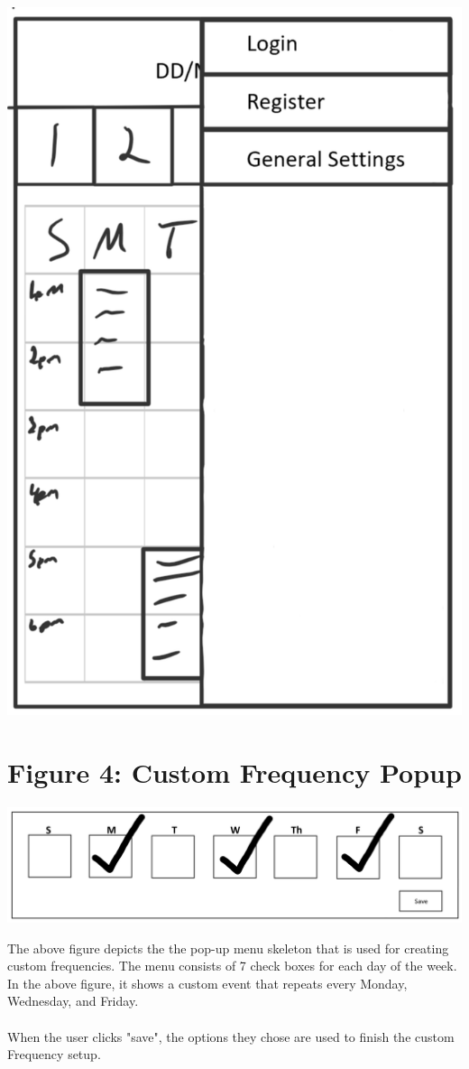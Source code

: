 \documentclass{scrreprt}
\begin{document}
\begin{center}
\includegraphics{hmlogout.PNG}
\end{center}

\section{Figure 4: Custom Frequency Popup}

\begin{center}
\includegraphics[width=\textwidth]{customfreq.PNG}
\end{center}

The above figure depicts the the pop-up menu skeleton that is used for creating custom frequencies.  The menu consists of 7 check boxes for each day of the week.  In the above figure, it shows a custom event that repeats every Monday, Wednesday, and Friday.
\\\\
When the user clicks "save", the options they chose are used to finish the custom Frequency setup.
\end{document}
